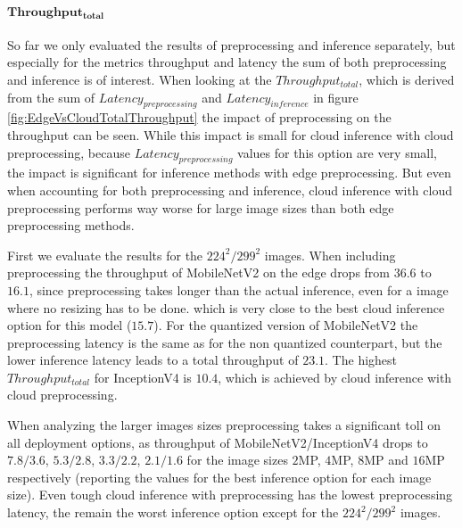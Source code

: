 \paragraph{$\mathbf{Throughput_{total}}$}
So far we only evaluated the results of preprocessing and inference separately, but especially for the metrics throughput and latency the sum of both preprocessing and inference is of interest.%
When looking at the $Throughput_{total}$, which is derived from the sum of $Latency_{preprocessing}$ and $Latency_{inference}$ in figure \ref{fig:EdgeVsCloudTotalThroughput} the impact of preprocessing on the throughput can be seen.
While this impact is small for cloud inference with cloud preprocessing, because $Latency_{preprocessing}$ values for this option are very small, the impact is significant for inference methods with edge preprocessing.
But even when accounting for both preprocessing and inference, cloud inference with cloud preprocessing performs way worse for large image sizes than both edge preprocessing methods.

First we evaluate the results for the $224^2/299^2$ images.
When including preprocessing  the throughput of MobileNetV2 on the edge drops from $36.6$ to $16.1$, since preprocessing takes longer than the actual inference, even for a image where no resizing has to be done.
which is very close to the best cloud inference option for this model ($15.7$).
For the quantized version of MobileNetV2 the preprocessing latency is the same as for the non quantized counterpart, but the lower inference latency leads to a total throughput of $23.1$.
The highest $Throughput_{total}$ for InceptionV4 is $10.4$, which is achieved by cloud inference with cloud preprocessing.

When analyzing the larger images sizes preprocessing takes a significant toll on all deployment options, as throughput of MobileNetV2/InceptionV4 drops to $7.8/3.6$, $5.3/2.8$, $3.3/2.2$, $2.1/1.6$ for the image sizes $2$MP, $4$MP, $8$MP and $16$MP respectively (reporting the values for the best inference option for each image size).
Even tough cloud inference with preprocessing has the lowest preprocessing latency, the remain the worst inference option except for the $224^2/299^2$ images.

